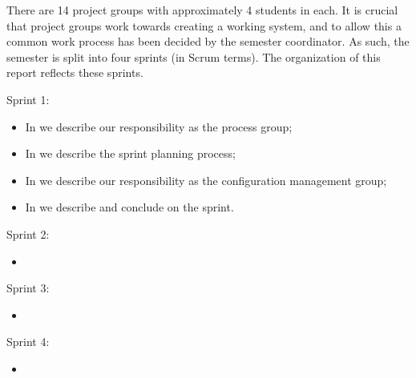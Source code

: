 There are 14 project groups with approximately 4 students in each. It is crucial that project groups work towards creating a working system, and to allow this a common work process has been decided by the semester coordinator. As such, the semester is split into four sprints (in Scrum terms). 
The organization of this report reflects these sprints. 

\begin{documentorganization}
  \item Sprint 1:
  \begin{itemize}
    \item In  we describe our responsibility as the process group;
    \item In  we describe the sprint planning process;
    \item In  we describe our responsibility as the configuration management group;
    \item In  we describe and conclude on the sprint. 
  \end{itemize}
  \item Sprint 2:
  \begin{itemize}
    \item {}
  \end{itemize}
  \item Sprint 3:
  \begin{itemize}
    \item {}
  \end{itemize}
  \item Sprint 4:
  \begin{itemize}
    \item {}
  \end{itemize}
\end{documentorganization}


